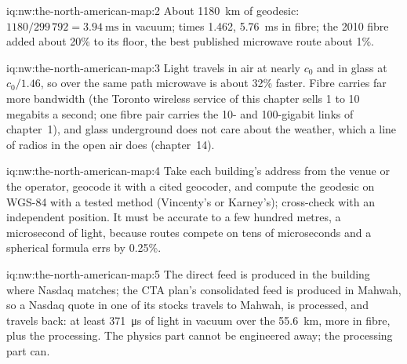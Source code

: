 \begin{solution}{iq:nw:the-north-american-map:2}
About \qty{1180}{\kilo\metre} of geodesic: $1180/299\,792 = \qty{3.94}{\milli\second}$ in vacuum; times 1.462, \qty{5.76}{\milli\second} in fibre;
the 2010 fibre added about 20\% to its floor, the best published microwave route about 1\%.
\end{solution}

\begin{solution}{iq:nw:the-north-american-map:3}
Light travels in air at nearly $c_0$ and in glass at $c_0/1.46$, so over the same path microwave is about 32\% faster. Fibre carries far more
bandwidth (the Toronto wireless service of this chapter sells 1 to 10 megabits a second; one fibre pair carries the 10- and 100-gigabit links of
chapter~1), and glass underground does not care about the weather, which a line of radios in the open air does (chapter~14).
\end{solution}

\begin{solution}{iq:nw:the-north-american-map:4}
Take each building's address from the venue or the operator, geocode it with a cited geocoder, and compute the geodesic on WGS-84 with a
tested method (Vincenty's or Karney's); cross-check with an independent position. It must be accurate to a few hundred metres, a microsecond of
light, because routes compete on tens of microseconds and a spherical formula errs by 0.25\%.
\end{solution}

\begin{solution}{iq:nw:the-north-american-map:5}
The direct feed is produced in the building where Nasdaq matches; the CTA plan's consolidated feed is produced in Mahwah, so a Nasdaq quote in
one of its stocks travels to Mahwah, is processed, and travels back: at least \qty{371}{\micro\second} of light in vacuum over the
\qty{55.6}{\kilo\metre}, more in fibre, plus the processing. The physics part cannot be engineered away; the processing part can.
\end{solution}

